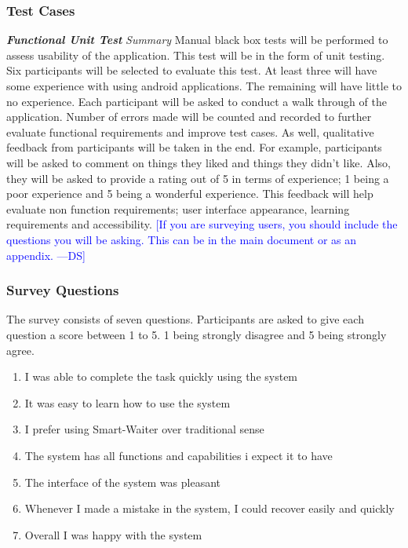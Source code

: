 \documentclass[12pt]{article}
\newcommand{\authornote}[3]{\textcolor{#1}{[#3 ---#2]}}
\newcommand{\authornote}[3]{}
\newcommand{\ds}[1]{\authornote{blue}{DS}{#1}}
\begin{document}
\subsubsection{Test Cases}
\textbf{\textit{Functional Unit Test}}\newline
\newline
\textit{Summary}\newline
Manual black box tests will be performed to assess usability of the application. This test will be in the form of unit testing. Six participants will be selected to evaluate this test. At least three will have some experience with using android applications. The remaining will have little to no experience. Each participant will be asked to conduct a walk through of the application. Number of errors made will be counted and recorded to further evaluate functional requirements and improve test cases. As well, qualitative feedback from participants will be taken in the end. For example, participants will be asked to comment on things they liked and things they didn't like. Also, they will be asked to provide a rating out of 5 in terms of experience; 1 being a poor experience and 5 being a wonderful experience. This feedback will help evaluate non function requirements; user interface appearance, learning requirements and accessibility. 
\ds{If you are surveying users, you should include the questions you will be asking.
This can be in the main document or as an appendix.}
\newline

\subsubsection{Survey Questions}
The survey consists of seven questions. Participants are asked to give each question a score between 1 to 5. 1 being strongly disagree and 5 being strongly agree.
\begin{enumerate}
  \item I was able to complete the task quickly using the system
  \item It was easy to learn how to use the system
  \item I prefer using Smart-Waiter over traditional sense
  \item The system has all functions and capabilities i expect it to have
  \item The interface of the system was pleasant
 \item Whenever I made a mistake in the system, I could recover easily and quickly
 \item Overall I was happy with the system
\end{enumerate}
\end{document}
